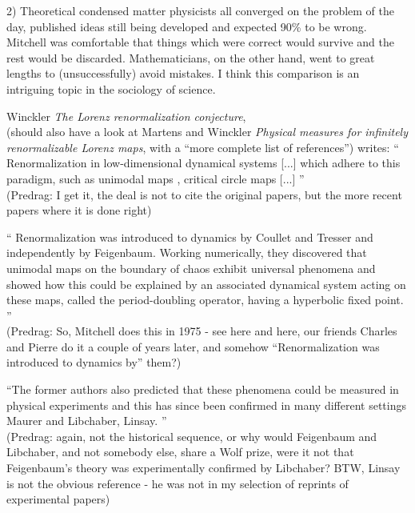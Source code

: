 \begin{description}
2) Theoretical condensed matter physicists all converged on the problem
of the day, published ideas still being developed and expected 90\% to be
wrong. Mitchell was comfortable that things which were correct would survive
and the rest would be discarded. Mathematicians, on the other hand, went
to great lengths to (unsuccessfully) avoid mistakes. I think this
comparison is an intriguing topic in the sociology of science.

\item[2018-05-03 Bj{\"o}rn]
{Winckler}
{\em The {Lorenz} renormalization conjecture}, \\
(should also have a look at Martens and Winckler {\em
Physical measures for infinitely renormalizable {Lorenz} maps}, with a
``more complete list of references'')
writes: ``
Renormalization in low-dimensional dynamical systems [...] which adhere
to this paradigm, such as unimodal maps
\cite{Sullivan92,McMullen96,AviLyu11}, critical circle maps
\cite{deFaria92,Yampolsky03} [...]
''
\\(Predrag: I get it, the deal is not to cite the original papers,
but the more recent papers where it is done right)

``
Renormalization was introduced to dynamics by Coullet and
Tresser and independently by Feigenbaum.
Working numerically, they discovered that unimodal maps on the boundary
of chaos exhibit universal phenomena and showed how this could be
explained by an associated dynamical system acting on these maps, called
the period-doubling operator, having a hyperbolic fixed point.
''
\\(Predrag: So, Mitchell does this in 1975 - see
 {here}
and  {here}, our
friends Charles and Pierre do it a couple of years later, and somehow
``Renormalization was introduced to dynamics by'' them?)

``The former authors also predicted that these phenomena could be
measured in physical experiments and this has since been confirmed in
many different settings Maurer and Libchaber, Linsay.
''
\\(Predrag: again, not the historical sequence, or why would Feigenbaum
and Libchaber, and not somebody else, share a Wolf prize, were it not
that Feigenbaum's theory was experimentally confirmed by Libchaber?
BTW, Linsay is not the obvious reference - he was not
in my selection of reprints of experimental papers)


\end{description}
